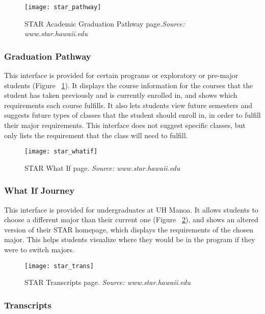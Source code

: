 \begin{figure}[h]
\centering
\texttt{[image: star\_pathway]}
\caption{STAR Academic Graduation Pathway page.\textit{Source: www.star.hawaii.edu}}
\label{star-pathway}
\end{figure}

\subsubsection{Graduation Pathway}

This interface is provided for certain programs or exploratory or pre-major students (Figure ~\ref{star-pathway}). It displays the course information for the courses that the student has taken previously and is currently enrolled in, and shows which requirements each course fulfills. It also lets students view future semesters and suggests future types of classes that the student should enroll in, in order to fulfill their major requirements. This interface does not suggest specific classes, but only lists the requirement that the class will need to fulfill. 

\begin{figure}[h]
\centering
\texttt{[image: star\_whatif]}
\caption{STAR What If page. \textit{Source: www.star.hawaii.edu}}
\label{star-what-if}
\end{figure}

\subsubsection{What If Journey}

This interface is provided for undergraduates at UH Manoa. It allows students to choose a different major than their current one (Figure ~\ref{star-what-if}), and shows an altered version of their STAR homepage, which displays the requirements of the chosen major. This helps students visualize where they would be in the program if they were to switch majors.

\begin{figure}[h]
\centering
\texttt{[image: star\_trans]}
\caption{STAR Transcripts page. \textit{Source: www.star.hawaii.edu}}
\label{star-transcripts}
\end{figure}

\subsubsection{Transcripts}

